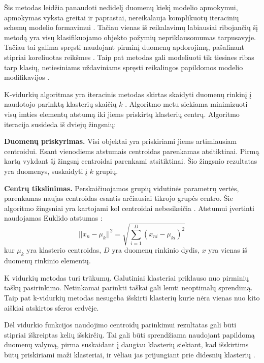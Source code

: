   Šis metodas leidžia panaudoti nedidelį duomenų kiekį modelio apmokymui, apmokymas vyksta greitai ir paprastai, nereikalauja komplikuotų iteracinių schemų modelio formavimui \cite{Wu2008}. Tačiau vienas iš reikalavimų labiausiai ribojančių šį metodą yra visų klasifikuojamo objekto požymių nepriklausomumas tarpusavyje. Tačiau tai galima spręsti naudojant pirminį duomenų apdorojimą, pašalinant stipriai koreliuotas reikšmes \cite{Wu2008}. Taip pat metodas gali modeliuoti tik tiesines ribas tarp klasių, netiesiniams uždaviniams spręsti reikalingos papildomos modelio modifikavijos \cite{comp}.

 K-vidurkių algoritmas yra iteracinis metodas skirtas skaidyti duomenų rinkinį į naudotojo parinktą klasterių skaičių $k$ \cite{Wu2008}. Algoritmo metu siekiama minimizuoti visų imties elementų atstumą iki jiems priskirtų klasterių centrų. Algoritmo iteracija susideda iš dviejų žingsnių:

 \textbf{Duomenų priskyrimas.} Visi objektai yra priskiriami jiems artimiausiam centroidui. Esant vienodiems atstumais centroidas parenkamas atsitiktinai. Pirmą kartą vykdant šį žingsnį centroidai parenkami atsitiktinai. Šio žingsnio rezultatas yra duomenys, suskaidyti į $k$ grupių.

 \textbf{Centrų tikslinimas.} Perskaičiuojamos grupių vidutinės parametrų vertės, parenkamas naujas centroidas esantis arčiausiai tikrojo grupės centro.
 Šie algoritmo žingsniai yra kartojami kol centroidai nebesikeičia \cite{Wu2008}. Atstumui įvertinti naudojamas Euklido atstumas \cite{comp}:
   \begin{equation}
   ||x_n - \mu_k||^2 = \sqrt{\sum_{i=1}^{D}(x_{ni} - \mu_{ki})^2}
   \end{equation}
   kur $\mu_k$ yra klasterio centroidas, $D$ yra duomenų rinkinio dydis, $x$ yra vienas iš duomenų rinkinio elementų.

   K vidurkių metodas turi trūkumų. Galutiniai klasteriai priklauso nuo pirminių taškų pasirinkimo. Netinkamai parinkti taškai gali lemti neoptimalų sprendimą. Taip pat k-vidurkių metodas nesugeba išskirti klasterių kurie nėra vienas nuo kito aiškiai atskirtos sferos erdvėje.

   Dėl vidurkio funkcijos naudojimo centroidų parinkimui rezultatas gali būti stipriai iškreiptas kelių išskirčių. Tai gali būti sprendžiama naudojant papildomą duomenų valymą, pirma suskaidant į daugiau klasterių siekiant, kad išskirtims būtų priskiriami maži klasteriai, ir vėliau jas prijungiant prie didesnių klasterių \cite{Wu2008}.

